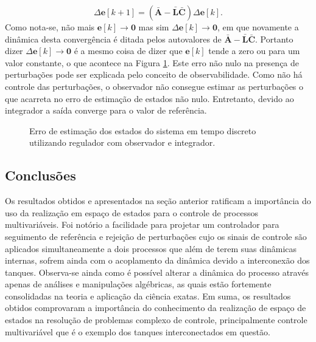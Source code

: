 \begin{equation}
    \label{eq:erro-da-estimacao-de-estados-com-observador-e-integrador}
    \Delta \mathbf{e}[k+1] =
    (\mathbf{\bar{A}} - \mathbf{\bar{L}}\mathbf{\bar{C}}) \Delta \mathbf{e}[k]
    \text{.}
\end{equation} Como nota-se, não mais $\mathbf{e}[k] \rightarrow \mathbf{0}$
mas sim $\Delta \mathbf{e}[k] \rightarrow \mathbf{0}$, em que novamente a
dinâmica desta convergência é ditada pelos autovalores de $\mathbf{\bar{A}} -
\mathbf{\bar{L}}\mathbf{\bar{C}}$. Portanto dizer $\Delta \mathbf{e}[k]
\rightarrow \mathbf{0}$ é a mesmo coisa de dizer que $\mathbf{e}[k]$ tende a
zero ou para um valor constante, o que acontece na Figura
\ref{fig:erro-de-estimacao-de-estados-com-observador-e-integrador}. Este erro
não nulo na presença de perturbações pode ser explicada pelo conceito de
observabilidade. Como não há controle das perturbações, o observador não
consegue estimar as perturbações o que acarreta no erro de estimação de estados
não nulo. Entretanto, devido ao integrador a saída converge para o valor de
referência.

\begin{figure}[!ht]
    \caption{Erro de estimação dos estados do sistema em tempo discreto
    utilizando regulador com observador e integrador.}
    \vspace{-10pt}
    \hspace{-30pt}
    \label{fig:erro-de-estimacao-de-estados-com-observador-e-integrador}
    \begin{minipage}{\linewidth}
        
    \end{minipage}
    \vspace{-10pt}
\end{figure}

\subsection{Conclusões}

Os resultados obtidos e apresentados na seção anterior ratificam a importância
do uso da realização em espaço de estados para o controle de processos
multivariáveis. Foi notório a facilidade para projetar um controlador para
seguimento de referência e rejeição de perturbações cujo os sinais de controle
são aplicados simultaneamente a dois processos que além de terem suas dinâmicas
internas, sofrem ainda com o acoplamento da dinâmica devido a interconexão dos
tanques. Observa-se ainda como é possível alterar a dinâmica do processo através
apenas de análises e manipulações algébricas, as quais estão fortemente
consolidadas na teoria e aplicação da ciência exatas. Em suma, os resultados
obtidos comprovaram a importância do conhecimento da realização de espaço de
estados na resolução de problemas complexo de controle, principalmente controle
multivariável que é o exemplo dos tanques interconectados em questão.
